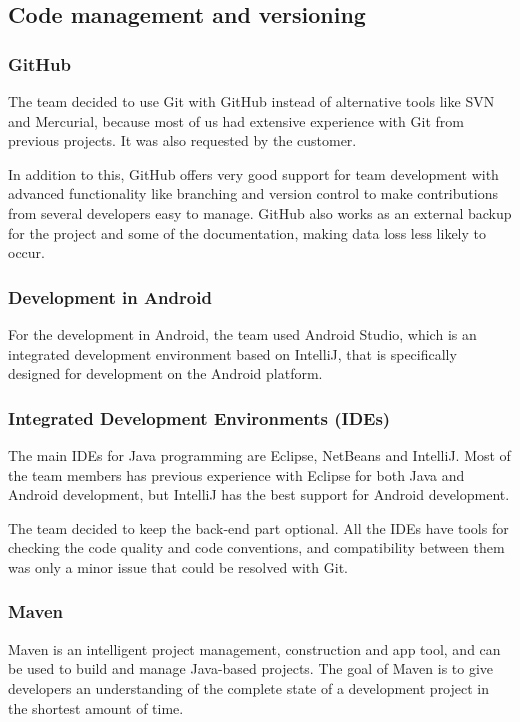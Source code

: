 \subsection{Code management and versioning}
\subsubsection{GitHub}
The team decided to use Git with GitHub instead of alternative tools like SVN and Mercurial, because most of us had extensive experience with Git from previous projects. It was also requested by the customer. 

In addition to this, GitHub offers very good support for team development with advanced functionality like branching and version control to make contributions from several developers easy to manage. GitHub also works as an external backup for the project and some of the documentation, making data loss less likely to occur.

\subsubsection{Development in Android}
For the development in Android, the team used Android Studio, which is an integrated development environment based on IntelliJ, that is specifically designed for development on the Android platform.

\subsubsection{Integrated Development Environments (IDEs)}
The main IDEs for Java programming are Eclipse, NetBeans and IntelliJ. Most of the team members has previous experience with Eclipse for both Java and Android development, but IntelliJ has the best support for Android development.

The team decided to keep the back-end part optional. All the IDEs have tools for checking the code quality and code conventions, and compatibility between them was only a minor issue that could be resolved with Git.

\subsubsection{Maven}
Maven is an intelligent project management, construction and app tool, and can be used to build and manage Java-based projects. The goal of Maven is to give developers an understanding of the complete state of a development project in the shortest amount of time.

